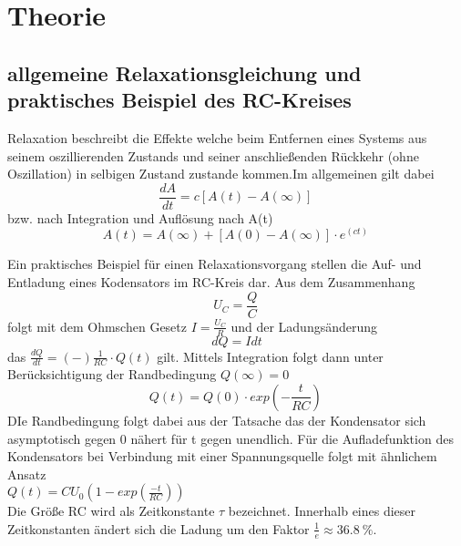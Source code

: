 \section{Theorie}
\label{sec:Theorie}
\subsection{allgemeine Relaxationsgleichung und praktisches Beispiel des RC-Kreises}
Relaxation beschreibt die  Effekte welche beim Entfernen eines Systems aus seinem oszillierenden Zustands und seiner anschließenden Rückkehr (ohne Oszillation) in 
selbigen Zustand zustande kommen.Im allgemeinen gilt dabei 
\begin{equation}
    \frac{dA}{dt}=c[A(t)-A(\infty)]\,
\end{equation}
bzw. nach Integration und Auflösung nach A(t)
\begin{equation}
    A(t)=A(\infty) + [A(0)-A(\infty)]\cdot e^(ct)\,
\label{eqn:voreqn2}
\end{equation}



Ein praktisches Beispiel für einen Relaxationsvorgang stellen die Auf- und Entladung eines Kodensators im RC-Kreis dar. Aus dem Zusammenhang
\begin{equation}
     U_{C}= \frac{Q}{C}\,
    \label{eqn:eqn2}
\end{equation}
folgt mit dem Ohmschen Gesetz $I= \frac{U_{C}}{R}$ und der Ladungsänderung \begin{equation}
    dQ = Idt
    \label{eqn:eqn3}
\end{equation} 
das $ \frac{dQ}{dt} = (-)\frac{1}{RC}\cdot Q(t)$ gilt.
Mittels Integration folgt dann unter Berücksichtigung der Randbedingung $Q(\infty)=0$
\begin{equation}
Q(t)= Q(0)\cdot exp(-\frac{t}{RC})\,
\label{eqn:eq1}
\end{equation}
DIe Randbedingung folgt dabei aus der Tatsache das der Kondensator sich asymptotisch gegen 0 nähert für t gegen unendlich.
Für die Aufladefunktion des Kondensators bei Verbindung mit einer Spannungsquelle folgt mit ähnlichem Ansatz\\
$Q(t)=C U_{0}(1-exp(\frac{-t}{RC}))$\\
Die Größe RC wird als Zeitkonstante $\tau$ bezeichnet. Innerhalb eines dieser Zeitkonstanten ändert sich die Ladung um den Faktor $\frac{1}{e} \approx \qty{36.8}{\percent}$.
